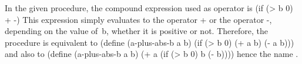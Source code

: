 In the given procedure, the compound expression used as operator is
\begtt{}
(if (> b 0) + -)
\endtt
This expression simply evaluates to the operator \code + or the operator \code -, depending on the value of \,\code b, whether it is positive or not.  Therefore, the procedure is equivalent to
\begtt{}
(define (a-plus-abs-b a b)
   (if (> b 0) 
       (+ a b)
       (- a b)))
\endtt
and also to
\begtt{}
(define (a-plus-abs-b a b)
   (+ a (if (> b 0)
            b
            (- b))))
\endtt
hence the name .
